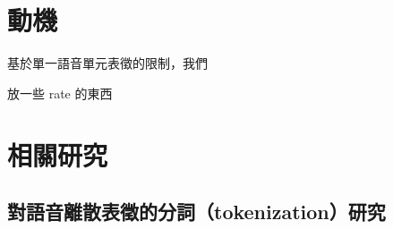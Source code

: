 
\section{動機}

基於單一語音單元表徵的限制，我們

放一些 rate 的東西



\section{相關研究}

\subsection{對語音離散表徵的分詞（tokenization）研究}

